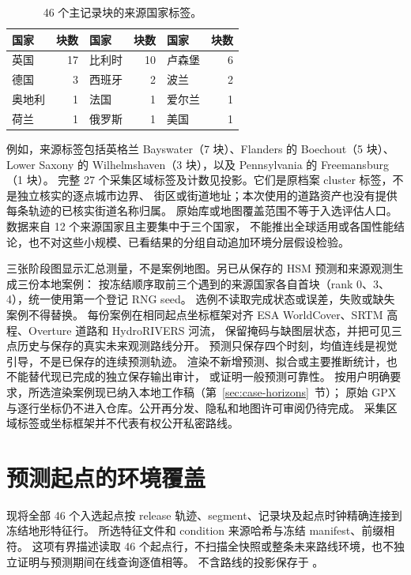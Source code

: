 \begin{table}[htbp]
\centering\small
\caption{46 个主记录块的来源国家标签。}
\label{tab:geographic-blocks}\hypertarget{tab:geographic-blocks}{}
\begin{tabular}{lr lr lr}
\toprule
国家 & 块数 & 国家 & 块数 & 国家 & 块数\\
\midrule
英国 & 17 & 比利时 & 10 & 卢森堡 & 6\\
德国 & 3 & 西班牙 & 2 & 波兰 & 2\\
奥地利 & 1 & 法国 & 1 & 爱尔兰 & 1\\
荷兰 & 1 & 俄罗斯 & 1 & 美国 & 1\\
\bottomrule
\end{tabular}
\end{table}

例如，来源标签包括英格兰 Bayswater（7 块）、Flanders 的 Boechout（5 块）、
Lower Saxony 的 Wilhelmshaven（3 块），以及 Pennsylvania 的 Freemansburg（1 块）。
完整 27 个采集区域标签及计数见投影。它们是原档案 cluster 标签，不是独立核实的逐点城市边界、
街区或街道地址；本次使用的道路资产也没有提供每条轨迹的已核实街道名称归属。
原始库或地图覆盖范围不等于入选评估人口。数据来自 12 个来源国家且主要集中于三个国家，
不能推出全球适用或各国性能结论，也不对这些小规模、已看结果的分组自动追加环境分层假设检验。

三张阶段图显示汇总测量，不是案例地图。另已从保存的 HSM 预测和来源观测生成三份本地案例：
按冻结顺序取前三个遇到的来源国家各自首块（rank 0、3、4），统一使用第一个登记 RNG seed。
选例不读取完成状态或误差，失败或缺失案例不得替换。
每份案例在相同起点坐标框架对齐 ESA WorldCover、SRTM 高程、Overture 道路和 HydroRIVERS 河流，
保留掩码与缺图层状态，并把可见三点历史与保存的真实未来观测路线分开。
预测只保存四个时刻，均值连线是视觉引导，不是已保存的连续预测轨迹。
渲染不新增预测、拟合或主要推断统计，也不能替代现已完成的独立保存输出审计，
或证明一般预测可靠性。
按用户明确要求，所选渲染案例现已纳入本地工作稿（第~\ref{sec:case-horizons}~节）；
原始 GPX 与逐行坐标仍不进入仓库。公开再分发、隐私和地图许可审阅仍待完成。
采集区域标签或坐标框架并不代表有权公开私密路线。


\section{预测起点的环境覆盖}
\label{sec:origin-environment}\hypertarget{sec:origin-environment}{}
现将全部 46 个入选起点按 release 轨迹、segment、记录块及起点时钟精确连接到冻结地形特征行。
所选特征文件和 condition 来源哈希与冻结 manifest、前缀相符。
这项有界描述读取 46 个起点行，不扫描全快照或整条未来路线环境，也不独立证明与预测期间在线查询逐值相等。
不含路线的投影保存于 。

